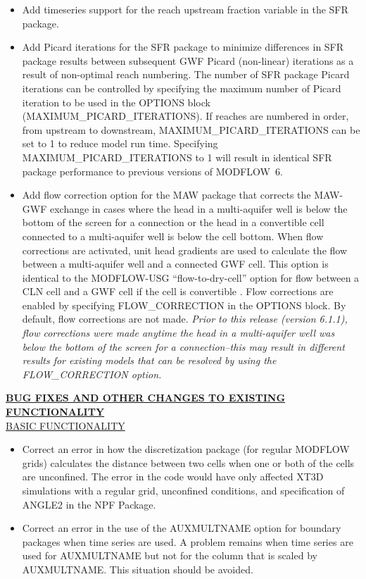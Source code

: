 \documentclass[11pt,twoside,twocolumn]{usgsreport}
\begin{document}
\begin{itemize}
\begin{itemize}
		\item Add timeseries support for the reach upstream fraction variable in the SFR package.
		\item Add Picard iterations for the SFR package to minimize differences in SFR package results between subsequent GWF Picard (non-linear) iterations as a result of non-optimal reach numbering. The number of SFR package Picard iterations can be controlled by specifying the maximum number of Picard  iteration to be used in the OPTIONS block (MAXIMUM\_PICARD\_ITERATIONS). If reaches are numbered in order, from upstream to downstream, MAXIMUM\_PICARD\_ITERATIONS can be set to 1 to reduce model run time. Specifying  MAXIMUM\_PICARD\_ITERATIONS to 1 will result in identical SFR package performance to previous versions of MODFLOW~6.
		\item Add flow correction option for the MAW package that corrects the MAW-GWF exchange in cases where the head in a multi-aquifer well is below the bottom of the screen for a connection or the head in a convertible cell connected to a multi-aquifer well is below the cell bottom.  When flow corrections are activated, unit head gradients are used to calculate the flow between a multi-aquifer well and a connected GWF cell. This option is identical to the MODFLOW-USG ``flow-to-dry-cell'' option for flow between a CLN cell and a GWF cell if the cell is convertible \citep{modflowusg}. Flow corrections are enabled by specifying FLOW\_CORRECTION in the OPTIONS block. By default, flow corrections are not made. \emph{Prior to this release (version 6.1.1), flow corrections were made anytime the head in a multi-aquifer well was below the bottom of the screen for a connection--this may result in different results for existing models that can be resolved by using the FLOW\_CORRECTION option.}
	\end{itemize}

	\textbf{\underline{BUG FIXES AND OTHER CHANGES TO EXISTING FUNCTIONALITY}} \\
	\underline{BASIC FUNCTIONALITY}
	\begin{itemize}
		\item Correct an error in how the discretization package (for regular MODFLOW grids) calculates the distance between two cells when one or both of the cells are unconfined.  The error in the code would have only affected XT3D simulations with a regular grid, unconfined conditions, and specification of ANGLE2 in the NPF Package.  
		\item Correct an error in the use of the AUXMULTNAME option for boundary packages when time series are used.  A problem remains when time series are used for AUXMULTNAME but not for the column that is scaled by AUXMULTNAME.  This situation should be avoided.
	\end{itemize}


\end{itemize}
\end{document}
